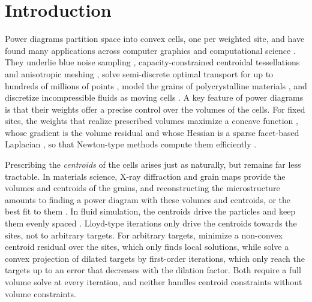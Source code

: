 \documentclass[main.tex]{subfiles}
\begin{document}
\section{Introduction}
\label{sec:intro}

Power diagrams partition space into convex cells, one per weighted site, and have found many applications across computer graphics and computational science \cite{Aurenhammer1987PowerDiagrams}.
They underlie blue noise sampling \cite{deGoes2012BlueNoise}, capacity-constrained centroidal tessellations \cite{Xin2016CentroidalPower} and anisotropic meshing \cite{Budninskiy2016OVT}, solve semi-discrete optimal transport for up to hundreds of millions of points \cite{Aurenhammer1998Minkowski, Levy2015Numerical, Nikakhtar2023Biased, Levy2025LargeScale}, model the grains of polycrystalline materials \cite{Lyckegaard2011Laguerre, Quey2018Optimal}, and discretize incompressible fluids as moving cells \cite{deGoes2015PowerParticles, Gallouet2018Lagrangian, PlateauHolleville2026Tutorial}.
A key feature of power diagrams is that their weights offer a precise control over the volumes of the cells.
For fixed sites, the weights that realize prescribed volumes maximize a concave function \cite{Aurenhammer1998Minkowski}, whose gradient is the volume residual and whose Hessian is a sparse facet-based Laplacian \cite{deGoes2012BlueNoise}, so that Newton-type methods compute them efficiently \cite{Levy2015Numerical, Levy2025LargeScale}.

Prescribing the \emph{centroids} of the cells arises just as naturally, but remains far less tractable.
In materials science, X-ray diffraction and grain maps provide the volumes and centroids of the grains, and reconstructing the microstructure amounts to finding a power diagram with these volumes and centroids, or the best fit to them \cite{Spettl2016Fitting, Petrich2019Reconstruction, Alpers2023GrainMaps, Bourne2025Inverting}.
In fluid simulation, the centroids drive the particles and keep them evenly spaced \cite{deGoes2015PowerParticles, Gallouet2018Lagrangian}.
Lloyd-type iterations \cite{Lloyd1982Quantization, Liu2009CVT, Xin2016CentroidalPower} only drive the centroids towards the sites, not to arbitrary targets.
For arbitrary targets, \citet{Bourne2025Inverting} minimize a non-convex centroid residual over the sites, which only finds local solutions, while \citet{Bourne2026ConvexOrder} solve a convex projection of dilated targets by first-order iterations, which only reach the targets up to an error that decreases with the dilation factor.
Both require a full volume solve at every iteration, and neither handles centroid constraints without volume constraints.
\end{document}
